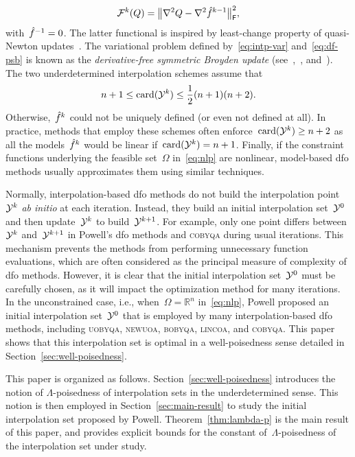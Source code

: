 \documentclass[draft]{article}
\numberwithin{equation}{section}
\theoremstyle{definition}
\theoremstyle{plain}
\DeclareMathOperator{\card}{card}
\newcommand{\fset}{\Omega}
\newcommand{\norm}[2][]{#1\lVert#2#1\rVert}
\newcommand{\obj}{f}
\newcommand{\objm}[1][]{\hat{\obj}\ifblank{#1}{}{^{#1}}}
\newcommand{\R}{\mathbb{R}}
\newcommand{\solvername}[1]{\textsc{#1}\xspace}
\newcommand{\xpt}[1][]{\mathcal{Y}\ifblank{#1}{}{^{#1}}}
\begin{document}
\begin{equation}
    \label{eq:df-psb}
    \mathcal{F}^k(Q) = \norm[\big]{\nabla^2 Q - \nabla^2 \objm[k - 1]}_{\mathsf{F}}^2,
\end{equation}
with~$\objm[-1] = 0$.
The latter functional is inspired by least-change property of quasi-Newton updates~\cite{Dennis_Schnabel_1979}.
The variational problem defined by~\eqref{eq:intp-var} and~\eqref{eq:df-psb} is known as the \emph{derivative-free symmetric Broyden update} (see~\cite{Powell_2013},~\cite[\S~3.6]{Zhang_2012}, and~\cite[\S~2.4.2]{Ragonneau_2022}).
The two underdetermined interpolation schemes assume that
\begin{equation*}
    n + 1 \le \card(\xpt[k]) \le \frac{1}{2} (n + 1) (n + 2).
\end{equation*}
Otherwise,~$\objm[k]$ could not be uniquely defined (or even not defined at all).
In practice, methods that employ these schemes often enforce~$\card(\xpt[k]) \ge n + 2$ as all the models~$\objm[k]$ would be linear if~$\card(\xpt[k]) = n + 1$.
Finally, if the constraint functions underlying the feasible set~$\fset$ in~\eqref{eq:nlp} are nonlinear, model-based \gls{dfo} methods usually approximates them using similar techniques.

Normally, interpolation-based \gls{dfo} methods do not build the interpolation point~$\xpt[k]$ \emph{ab initio} at each iteration.
Instead, they build an initial interpolation set~$\xpt[0]$ and then  update~$\xpt[k]$ to build~$\xpt[k + 1]$.
For example, only one point differs between~$\xpt[k]$ and~$\xpt[k + 1]$ in Powell's \gls{dfo} methods and \solvername{cobyqa} during usual iterations.
This mechanism prevents the methods from performing unnecessary function evaluations, which are often considered as the principal measure of complexity of \gls{dfo} methods.
However, it is clear that the initial interpolation set~$\xpt[0]$ must be carefully chosen, as it will impact the optimization method for many iterations.
In the unconstrained case, i.e., when~$\fset = \R^n$ in~\eqref{eq:nlp}, Powell proposed an initial interpolation set~$\xpt[0]$ that is employed by many interpolation-based \gls{dfo} methods, including \solvername{uobyqa}, \solvername{newuoa}, \solvername{bobyqa}, \solvername{lincoa}, and \solvername{cobyqa}.
This paper shows that this interpolation set is optimal in a well-poisedness sense detailed in Section~\ref{sec:well-poisedness}.

This paper is organized as follows.
Section~\ref{sec:well-poisedness} introduces the notion of $\Lambda$-poisedness of interpolation sets in the underdetermined sense.
This notion is then employed in Section~\ref{sec:main-result} to study the initial interpolation set proposed by Powell.
Theorem~\ref{thm:lambda-p} is the main result of this paper, and provides explicit bounds for the constant of~$\Lambda$-poisedness of the interpolation set under study.
\end{document}
